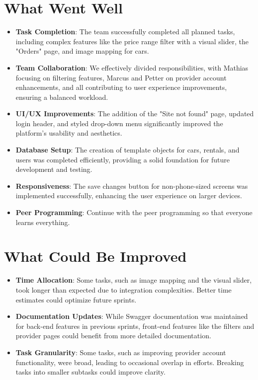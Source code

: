 \documentclass[a4paper,12pt]{article}
\begin{document}
\section*{What Went Well}
\begin{itemize}
    \item \textbf{Task Completion}: The team successfully completed all planned tasks, including complex features like the price range filter with a visual slider, the "Orders" page, and image mapping for cars.
    \item \textbf{Team Collaboration}: We effectively divided responsibilities, with Mathias focusing on filtering features, Marcus and Petter on provider account enhancements, and all contributing to user experience improvements, ensuring a balanced workload.
    \item \textbf{UI/UX Improvements}: The addition of the "Site not found" page, updated login header, and styled drop-down menu significantly improved the platform’s usability and aesthetics.
    \item \textbf{Database Setup}: The creation of template objects for cars, rentals, and users was completed efficiently, providing a solid foundation for future development and testing.
    \item \textbf{Responsiveness}: The save changes button for non-phone-sized screens was implemented successfully, enhancing the user experience on larger devices.
    \item \textbf{Peer Programming}: Continue with the peer programming so that everyone learns everything.
\end{itemize}

\section*{What Could Be Improved}
\begin{itemize}
    \item \textbf{Time Allocation}: Some tasks, such as image mapping and the visual slider, took longer than expected due to integration complexities. Better time estimates could optimize future sprints.
    \item \textbf{Documentation Updates}: While Swagger documentation was maintained for back-end features in previous sprints, front-end features like the filters and provider pages could benefit from more detailed documentation.
    \item \textbf{Task Granularity}: Some tasks, such as improving provider account functionality, were broad, leading to occasional overlap in efforts. Breaking tasks into smaller subtasks could improve clarity.

\end{itemize}
\end{document}
